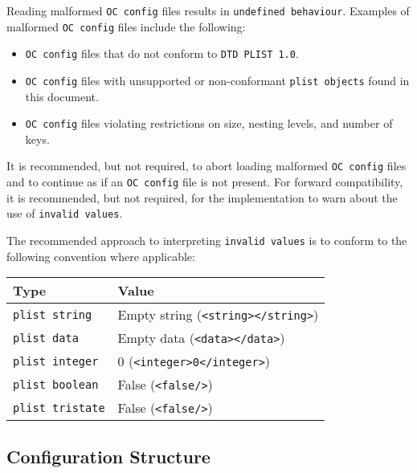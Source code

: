 \documentclass[]{article}
\providecommand{\tightlist}{%
  \setlength{\itemsep}{0pt}\setlength{\parskip}{0pt}}
\begin{document}
Reading malformed \texttt{OC\ config} files results in
\texttt{undefined\ behaviour}. Examples of malformed \texttt{OC\ config} files
include the following:

\begin{itemize}
\tightlist
\item
  \texttt{OC\ config} files that do not conform to \texttt{DTD PLIST 1.0}.
\item
  \texttt{OC\ config} files with unsupported or non-conformant \texttt{plist\ objects} found
  in this document.
\item
  \texttt{OC\ config} files violating restrictions on size, nesting levels, and number of keys.
\end{itemize}

It is recommended, but not required, to abort loading malformed
\texttt{OC\ config} files and to continue as if an \texttt{OC\ config} file is
not present. For forward compatibility, it is recommended, but not required,
for the implementation to warn about the use of \texttt{invalid\ values}.

The recommended approach to interpreting \texttt{invalid\ values}
is to conform to the following convention where applicable:

\begin{center}
\begin{tabular}{|l|l|}
\hline
\textbf{Type} & \textbf{Value} \\
\hline
\texttt{plist\ string} & Empty string
(\texttt{\textless{}string\textgreater{}\textless{}/string\textgreater{}}) \\
\hline
\texttt{plist\ data} & Empty data
(\texttt{\textless{}data\textgreater{}\textless{}/data\textgreater{}}) \\
\hline
\texttt{plist\ integer} & 0
(\texttt{\textless{}integer\textgreater{}0\textless{}/integer\textgreater{}}) \\
\hline
\texttt{plist\ boolean} & False
(\texttt{\textless{}false/\textgreater{}}) \\
\hline
\texttt{plist\ tristate} & False
(\texttt{\textless{}false/\textgreater{}}) \\
\hline
\end{tabular}
\end{center}

\subsection{Configuration Structure}\label{configuration-structure}
\end{document}
